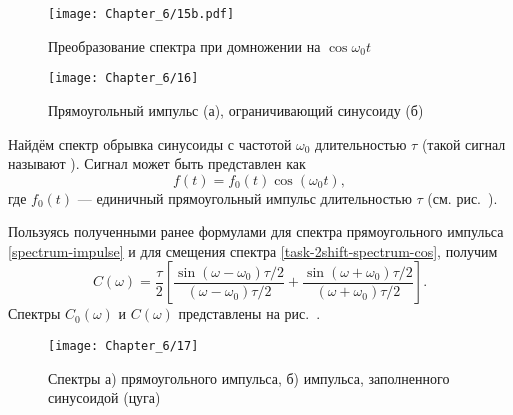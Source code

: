 \begin{figure}[h!]
\centering\texttt{[image: Chapter\_6/15b.pdf]}
    \caption{Преобразование спектра при домножении на $\cos \omega_0 t$}
\end{figure}

\begin{wrapfigure}{o}{0.5\textwidth}
\texttt{[image: Chapter\_6/16]}
    \caption{\footnotesize Прямоугольный импульс (а), ограничивающий синусоиду (б)}
\end{wrapfigure}

\begin{lab:example}\label{example:one-zug}
Найдём спектр обрывка синусоиды с частотой $\omega_0$
длительностью $\tau$ (такой сигнал называют ).
Сигнал может быть представлен как
\begin{equation*}f(t)=f_0(t)\cos(\omega_0 t),\end{equation*} где $f_0(t)$ --- единичный прямоугольный
импульс длительностью $\tau$ (см. рис.~).

Пользуясь полученными ранее формулами для спектра прямоугольного импульса
\eqref{spectrum-impulse} и для смещения спектра \eqref{task-2shift-spectrum-cos},
получим
\begin{equation*}
C(\omega)=\frac{\tau}{2}\left[\frac{\sin(\omega-\omega_0)\tau/2}{
(\omega-\omega_0)\tau/2}+
\frac{\sin(\omega+\omega_0)\tau/2}{(\omega+\omega_0)\tau/2}
\right].
\end{equation*}
Спектры $C_0(\omega)$ и $C(\omega)$ представлены на
рис.~.

\begin{figure}[h!]
\centering\texttt{[image: Chapter\_6/17]}
    \caption{Спектры а) прямоугольного импульса, б) импульса,
        заполненного синусоидой (цуга)}
\end{figure}
\end{lab:example}


